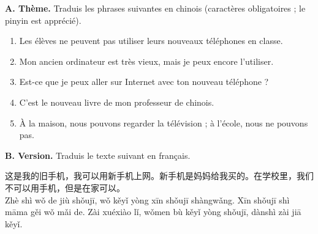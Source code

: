 \documentclass[11pt]{article}
\begin{document}
\begin{exercice}
\textbf{A. Thème.} Traduis les phrases suivantes en chinois (caractères obligatoires ; le pinyin est apprécié).

\begin{enumerate}
\item Les élèves ne peuvent pas utiliser leurs nouveaux téléphones en classe.
\item Mon ancien ordinateur est très vieux, mais je peux encore l'utiliser.
\item Est-ce que je peux aller sur Internet avec ton nouveau téléphone ?
\item C'est le nouveau livre de mon professeur de chinois.
\item À la maison, nous pouvons regarder la télévision ; à l'école, nous ne pouvons pas.
\end{enumerate}

\textbf{B. Version.} Traduis le texte suivant en français.

\begin{textebox}[À traduire]
这是我的旧手机，我可以用新手机上网。新手机是妈妈给我买的。在学校里，我们不可以用手机，但是在家可以。\\[4pt]
Zhè shì wǒ de jiù shǒujī, wǒ kěyǐ yòng xīn shǒujī shàngwǎng. Xīn shǒujī shì māma gěi wǒ mǎi de. Zài xuéxiào lǐ, wǒmen bù kěyǐ yòng shǒujī, dànshì zài jiā kěyǐ.
\end{textebox}
\end{exercice}
\end{document}
